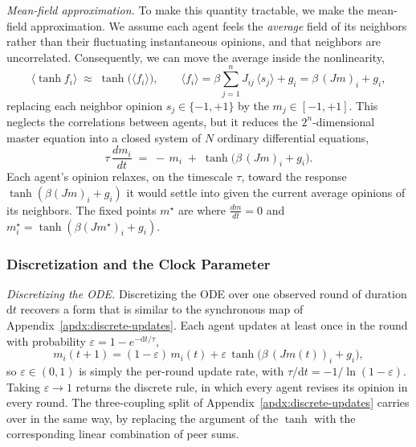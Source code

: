 \textit{Mean-field approximation.} To make this quantity tractable, we make the mean-field approximation. We assume each agent feels the \emph{average} field of its neighbors rather than their fluctuating instantaneous opinions, and that neighbors are uncorrelated. Consequently, we
can move the average inside the nonlinearity,
\[
\big\langle \tanh f_i\big\rangle \;\approx\; \tanh\big(\langle f_i\rangle\big),
\qquad
\langle f_i\rangle = \beta\sum_{j=1}^n J_{ij}\,\langle s_j\rangle + g_i = \beta\,(Jm)_i + g_i,
\]
replacing each neighbor opinion $s_j \in \{ -1, +1\}$ by the $m_j \in [-1, +1]$. This neglects the correlations between agents, but it reduces the $2^n$-dimensional master equation into a closed system of $N$ ordinary differential equations,
\[
\tau\,\frac{d m_i}{dt} \;=\; -\,m_i \;+\; \tanh\!\Big(\beta\,(Jm)_i + g_i\Big).
\]
Each agent's opinion relaxes, on the timescale $\tau$, toward the response
$\tanh(\beta(Jm)_i + g_i)$ it would settle into given the current average opinions of its
neighbors. The fixed points $m^\star$ are where $\frac{d m}{dt} = 0$ and $m_i^\star = \tanh(\beta(Jm^\star)_i + g_i)$.

\subsubsection{Discretization and the Clock Parameter}

\textit{Discretizing the ODE.} Discretizing the ODE over one observed round of duration
$\mathrm dt$ recovers a form that is similar to the synchronous map of Appendix~\ref{apdx:discrete-updates}. Each agent
updates at least once in the round with probability $\varepsilon = 1 - e^{-\mathrm dt/\tau}$,
\[
m_i(t{+}1) = (1-\varepsilon)\,m_i(t) + \varepsilon\,\tanh\!\Big(\beta\,(Jm(t))_i + g_i\Big),
\]
so $\varepsilon \in (0,1)$ is simply the per-round update rate, with
$\tau/\mathrm dt = -1/\ln(1-\varepsilon)$. Taking $\varepsilon \to 1$ returns the discrete rule,
in which every agent revises its opinion in every round.  The three-coupling split of
Appendix~\ref{apdx:discrete-updates} carries over in the same way, by replacing the argument of the $\tanh$ with the corresponding linear combination of peer sums.
